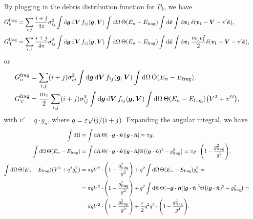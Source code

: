 \documentclass[aps,prl,preprint,groupedaddress,10pt]{revtex4-2}
\begin{document}
By plugging in the debris distribution function for $P_k$, we have
\begin{equation}
    \begin{split}
        \lutx{G}{n}{frag} &= \sum_{i,j}\frac{i+j}{4\pi}\sigma_{ij}^2\int\dd{\bg}\dd{\bV}
        f_{ij}\pqty{\bg,\bV}\int\dd{\Omega}\Theta\pqty{E_n-\ltx{E}{frag}}
        \int\dd{\be}\int\dd{\bv_1}\delta\pqty{\bv_1-\bV-v'\be},\\
        \lutx{G}{T}{frag} &= \sum_{i,j}\frac{i+j}{4\pi}\sigma_{ij}^2\int\dd{\bg}\dd{\bV}
        f_{ij}\pqty{\bg,\bV}\int\dd{\Omega}\Theta\pqty{E_n-\ltx{E}{frag}}
        \int\dd{\be}\int\dd{\bv_1}\frac{m_1v_1^2}{2}\delta\pqty{\bv_1-\bV-v'\be},
    \end{split}
\end{equation}
or
\begin{equation}
    \begin{split}
        \lutx{G}{n}{frag} &= \sum_{i,j}(i+j)\sigma_{ij}^2\int\dd{\bg}\dd{\bV}
        f_{ij}\pqty{\bg,\bV}\int\dd{\Omega}\Theta\pqty{E_n-\ltx{E}{frag}},\\
        \lutx{G}{T}{frag} &= \frac{m_1}{2}\sum_{i,j}(i+j)\sigma_{ij}^2\int\dd{\bg}\dd{\bV}
        f_{ij}\pqty{\bg,\bV}\int\dd{\Omega}\Theta\pqty{E_n-\ltx{E}{frag}}
        \pqty{V^2+v'^2},
    \end{split}
\end{equation}
with $v'=q\cdot g_n$, where $q=\varepsilon\sqrt{ij}/(i+j)$. Expanding the angular integral, we
have
\begin{equation}
    \begin{split}
        \int\dd{\Omega} &= \int\dd{\bn}\Theta\pqty{-\bg\vdot\bn}\abs{\bg\vdot\bn}=\pi g,\\
        \int\dd{\Omega}\Theta\pqty{E_n-\ltx{E}{frag}}
        &=\int\dd{\bn}\Theta\pqty{-\bg\vdot\bn}\abs{\bg\vdot\bn}
        \Theta\pqty{(\bg\vdot\bn)^2-\ltx{g^2}{frag}}=
        \pi g\cdot\pqty{1-\frac{\ltx{g^2}{frag}}{g^2}},\\
        \int\dd{\Omega}\Theta\pqty{E_n-\ltx{E}{frag}}\pqty{V^2+q^2g_n^2} &=
        \pi gV^2\cdot\pqty{1-\frac{\ltx{g^2}{frag}}{g^2}}+
        q^2\int\dd{\Omega}\Theta\pqty{E_n-\ltx{E}{frag}}g_n^2=\\
        &=\pi gV^2\cdot\pqty{1-\frac{\ltx{g^2}{frag}}{g^2}}+
        q^2\int\dd{\bn}\Theta\pqty{-\bg\vdot\bn}\abs{\bg\vdot\bn}^3
        \Theta\pqty{(\bg\vdot\bn)^2-\ltx{g^2}{frag}}=\\
        &=\pi gV^2\cdot\pqty{1-\frac{\ltx{g^2}{frag}}{g^2}}+
        \frac{\pi}{2}q^2g^3\cdot\pqty{1-\frac{\ltx{g^4}{frag}}{g^4}}.
    \end{split}
\end{equation}
\end{document}

